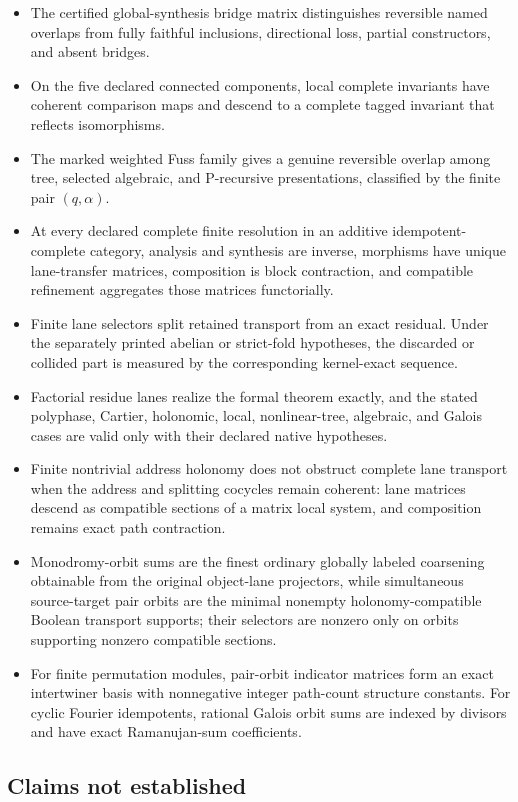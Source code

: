 \begin{itemize}
\item The certified global-synthesis bridge matrix distinguishes reversible named overlaps from fully faithful inclusions, directional loss, partial constructors, and absent bridges.
\item On the five declared connected components, local complete invariants have coherent comparison maps and descend to a complete tagged invariant that reflects isomorphisms.
\item The marked weighted Fuss family gives a genuine reversible overlap among tree, selected algebraic, and P-recursive presentations, classified by the finite pair \((q,\alpha)\).
\item At every declared complete finite resolution in an additive idempotent-complete category, analysis and synthesis are inverse, morphisms have unique lane-transfer matrices, composition is block contraction, and compatible refinement aggregates those matrices functorially.
\item Finite lane selectors split retained transport from an exact residual. Under the separately printed abelian or strict-fold hypotheses, the discarded or collided part is measured by the corresponding kernel-exact sequence.
\item Factorial residue lanes realize the formal theorem exactly, and the stated polyphase, Cartier, holonomic, local, nonlinear-tree, algebraic, and Galois cases are valid only with their declared native hypotheses.
\item Finite nontrivial address holonomy does not obstruct complete lane transport when the address and splitting cocycles remain coherent: lane matrices descend as compatible sections of a matrix local system, and composition remains exact path contraction.
\item Monodromy-orbit sums are the finest ordinary globally labeled coarsening obtainable from the original object-lane projectors, while simultaneous source-target pair orbits are the minimal nonempty holonomy-compatible Boolean transport supports; their selectors are nonzero only on orbits supporting nonzero compatible sections.
\item For finite permutation modules, pair-orbit indicator matrices form an exact intertwiner basis with nonnegative integer path-count structure constants. For cyclic Fourier idempotents, rational Galois orbit sums are indexed by divisors and have exact Ramanujan-sum coefficients.
\end{itemize}

\subsection{Claims not established}


